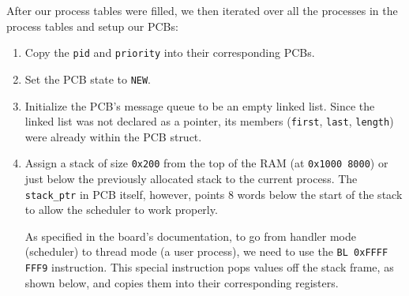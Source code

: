 \documentclass[se]{uw-wkrpt}
\newcommand{\memsection}[4]{
	\bytefieldsetup{bitheight=#3\baselineskip} %
	\bitbox[]{10}{
		\texttt{#1} %
		\\ \vspace{#3\baselineskip} \vspace{-2\baselineskip} \vspace{-#3pt} %
		\texttt{#2} %
	}
	\bitbox{16}{#4} %
}
\begin{document}
After our process tables were filled, we then iterated over all the processes in the process tables and setup our PCBs:
\begin{enumerate}
	\item
	Copy the \texttt{pid} and \texttt{priority} into their corresponding PCBs.

	\item
	Set the PCB state to \texttt{NEW}.

	\item
	Initialize the PCB's message queue to be an empty linked list. Since the linked list was not declared as a pointer, its members (\texttt{first}, \texttt{last}, \texttt{length}) were already within the PCB struct.
	
	\item
	Assign a stack of size \texttt{0x200} from the top of the RAM (at \texttt{0x1000 8000}) or just below the previously allocated stack to the current process. The \texttt{stack\_ptr} in PCB itself, however, points 8 words below the start of the stack to allow the scheduler to work properly.
	
	 As specified in the board's documentation, to go from handler mode (scheduler) to thread mode (a user process), we need to use the \texttt{BL 0xFFFF FFF9} instruction. This special instruction pops values off the stack frame, as shown below, and copies them into their corresponding registers.
	
	

\end{enumerate}
\end{document}

